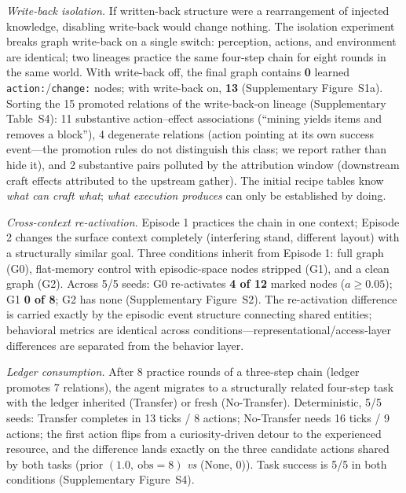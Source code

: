 \documentclass[10pt,a4paper]{article}
\begin{document}
\emph{Write-back isolation.} If written-back structure were a rearrangement of injected knowledge, disabling write-back would change nothing. The isolation experiment breaks graph write-back on a single switch: perception, actions, and environment are identical; two lineages practice the same four-step chain for eight rounds in the same world. With write-back off, the final graph contains \textbf{0} learned \texttt{action:}/\texttt{change:} nodes; with write-back on, \textbf{13} (Supplementary Figure~S1a). Sorting the 15 promoted relations of the write-back-on lineage (Supplementary Table~S4): 11 substantive action--effect associations (``mining yields items and removes a block''), 4 degenerate relations (action pointing at its own success event---the promotion rules do not distinguish this class; we report rather than hide it), and 2 substantive pairs polluted by the attribution window (downstream craft effects attributed to the upstream gather). The initial recipe tables know \emph{what can craft what}; \emph{what execution produces} can only be established by doing.

\emph{Cross-context re-activation.} Episode 1 practices the chain in one context; Episode 2 changes the surface context completely (interfering stand, different layout) with a structurally similar goal. Three conditions inherit from Episode 1: full graph (G0), flat-memory control with episodic-space nodes stripped (G1), and a clean graph (G2). Across 5/5 seeds: G0 re-activates \textbf{4 of 12} marked nodes ($a\ge0.05$); G1 \textbf{0 of 8}; G2 has none (Supplementary Figure~S2). The re-activation difference is carried exactly by the episodic event structure connecting shared entities; behavioral metrics are identical across conditions---representational/access-layer differences are separated from the behavior layer.

\emph{Ledger consumption.} After 8 practice rounds of a three-step chain (ledger promotes 7 relations), the agent migrates to a structurally related four-step task with the ledger inherited (Transfer) or fresh (No-Transfer). Deterministic, 5/5 seeds: Transfer completes in 13 ticks / 8 actions; No-Transfer needs 16 ticks / 9 actions; the first action flips from a curiosity-driven detour to the experienced resource, and the difference lands exactly on the three candidate actions shared by both tasks (prior $(1.0,\ \text{obs}{=}8)$ \emph{vs} (None, 0)). Task success is 5/5 in both conditions (Supplementary Figure~S4).
\end{document}
